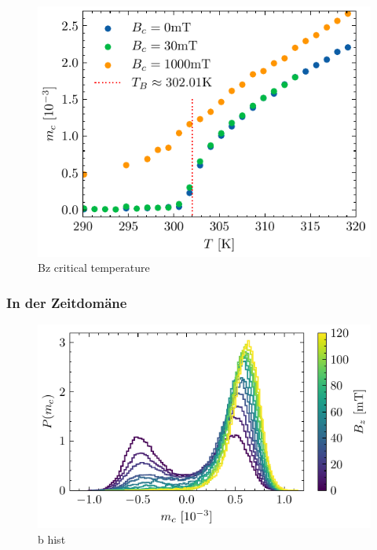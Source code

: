 \documentclass[main.tex]{subfiles}
\begin{document}
\begin{figure}[H]
    \centering
    \includegraphics{bilder/plots/Bz_comparison/critical_temperature.pdf}
    \caption{Bz critical temperature }\label{fig:bz-crit-temp}
\end{figure}


\subsubsection{In der Zeitdomäne}


\begin{figure}[H]
    \centering
    \includegraphics{bilder/plots/max_Bz/mc_hist.pdf}
    \caption{b hist}\label{fig:b-hist}    
\end{figure}
\end{document}
